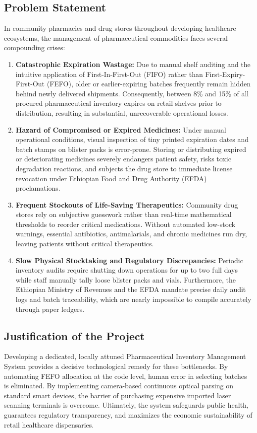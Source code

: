 \subsection{Problem Statement}
In community pharmacies and drug stores throughout developing healthcare ecosystems, the management of pharmaceutical commodities faces several compounding crises:
\begin{enumerate}
    \item \textbf{Catastrophic Expiration Wastage:} Due to manual shelf auditing and the intuitive application of First-In-First-Out (FIFO) rather than First-Expiry-First-Out (FEFO), older or earlier-expiring batches frequently remain hidden behind newly delivered shipments. Consequently, between 8\% and 15\% of all procured pharmaceutical inventory expires on retail shelves prior to distribution, resulting in substantial, unrecoverable operational losses.
    \item \textbf{Hazard of Compromised or Expired Medicines:} Under manual operational conditions, visual inspection of tiny printed expiration dates and batch stamps on blister packs is error-prone. Storing or distributing expired or deteriorating medicines severely endangers patient safety, risks toxic degradation reactions, and subjects the drug store to immediate license revocation under Ethiopian Food and Drug Authority (EFDA) proclamations.
    \item \textbf{Frequent Stockouts of Life-Saving Therapeutics:} Community drug stores rely on subjective guesswork rather than real-time mathematical thresholds to reorder critical medications. Without automated low-stock warnings, essential antibiotics, antimalarials, and chronic medicines run dry, leaving patients without critical therapeutics.
    \item \textbf{Slow Physical Stocktaking and Regulatory Discrepancies:} Periodic inventory audits require shutting down operations for up to two full days while staff manually tally loose blister packs and vials. Furthermore, the Ethiopian Ministry of Revenues and the EFDA mandate precise daily audit logs and batch traceability, which are nearly impossible to compile accurately through paper ledgers.
\end{enumerate}

\subsection{Justification of the Project}
Developing a dedicated, locally attuned Pharmaceutical Inventory Management System provides a decisive technological remedy for these bottlenecks. By automating FEFO allocation at the code level, human error in selecting batches is eliminated. By implementing camera-based continuous optical parsing on standard smart devices, the barrier of purchasing expensive imported laser scanning terminals is overcome. Ultimately, the system safeguards public health, guarantees regulatory transparency, and maximizes the economic sustainability of retail healthcare dispensaries.

